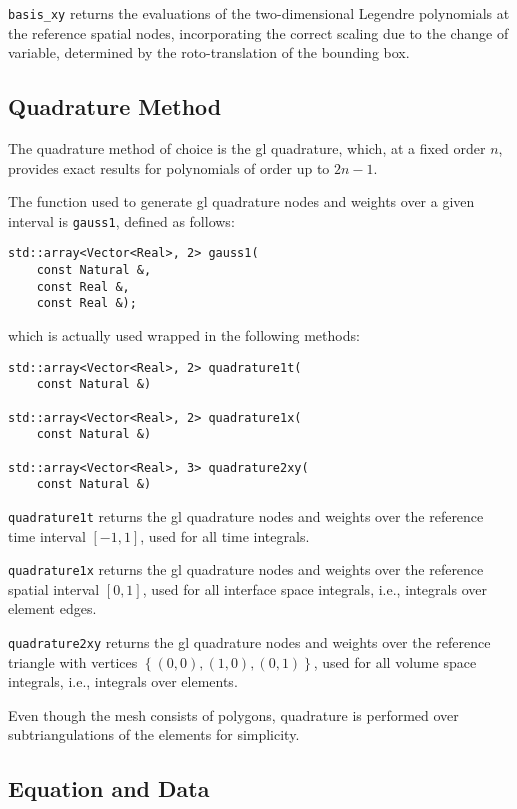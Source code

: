 \lstinline{basis_xy} returns the evaluations of the two-dimensional Legendre polynomials at the reference spatial nodes, incorporating the correct scaling due to the change of variable, determined by the roto-translation of the bounding box.

\newpage
\subsection{Quadrature Method} \label{subsection:quadrature}

The quadrature method of choice is the \acrfull{gl} quadrature, which, at a fixed order $n$, provides exact results for polynomials of order up to $2n - 1$.

The function used to generate \acrshort{gl} quadrature nodes and weights over a given interval is \lstinline{gauss1}, defined as follows:
\begin{lstlisting}[style=cpp]
std::array<Vector<Real>, 2> gauss1(
    const Natural &, 
    const Real &, 
    const Real &);
\end{lstlisting}
which is actually used wrapped in the following methods:
\begin{lstlisting}[style=cpp]
std::array<Vector<Real>, 2> quadrature1t(
    const Natural &)

std::array<Vector<Real>, 2> quadrature1x(
    const Natural &)

std::array<Vector<Real>, 3> quadrature2xy(
    const Natural &)
\end{lstlisting}

\lstinline{quadrature1t} returns the \acrshort{gl} quadrature nodes and weights over the reference time interval $\left[ -1, 1 \right]$, used for all time integrals.

\lstinline{quadrature1x} returns the \acrshort{gl} quadrature nodes and weights over the reference spatial interval $\left[ 0, 1 \right]$, used for all interface space integrals, i.e., integrals over element edges.

\lstinline{quadrature2xy} returns the \acrshort{gl} quadrature nodes and weights over the reference triangle with vertices $\left\{ \left( 0, 0 \right), \left( 1, 0 \right), \left( 0, 1 \right) \right\}$, used for all volume space integrals, i.e., integrals over elements.

Even though the mesh consists of polygons, quadrature is performed over subtriangulations of the elements for simplicity.

\newpage
\subsection{Equation and Data}

